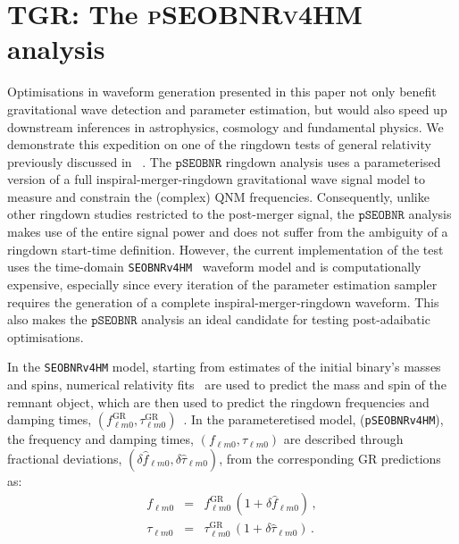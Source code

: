 \documentclass[twocolumn,prd,aps,superscriptaddress,preprintnumbers,tightenlines,showpacs,nofootinbib,eqsecnum,amsfonts,amsmath]{revtex4-1}
\newcommand{\pSEOB}{\texttt{pSEOBNR}}
\begin{document}
\section{TGR: The \textsc{pSEOBNRv4HM} analysis}
\label{sec:pa_tgr}
Optimisations in waveform generation presented in this paper not only benefit gravitational wave detection and parameter estimation, but would also speed up downstream inferences in astrophysics, cosmology and fundamental physics. We demonstrate this expedition on one of the ringdown tests of general relativity previously discussed in ~\cite{Ghosh:2016xx:prep,Abbott:2020jks,Brito:2018rfr}. The $\pSEOB$ ringdown analysis uses a parameterised version of a full inspiral-merger-ringdown gravitational wave signal model to measure and constrain the (complex) QNM frequencies. Consequently, unlike other ringdown studies restricted to the post-merger signal, the $\pSEOB$ analysis makes use of the entire signal power and does not suffer from the ambiguity of a ringdown start-time definition. However, the current implementation of the test uses the time-domain \texttt{SEOBNRv4HM}~\cite{Cotesta:2018fcv} waveform model and is computationally expensive, especially since every iteration of the parameter estimation sampler requires the generation of a complete inspiral-merger-ringdown waveform. This also makes the $\pSEOB$ analysis an ideal candidate for testing post-adaibatic optimisations.
\par
In the \texttt{SEOBNRv4HM} model, starting from estimates of the initial binary's masses and spins, numerical relativity fits~\cite{Taracchini:2013rva,Hofmann:2016yih} are used to predict the mass and spin of the remnant object, which are then used to predict the ringdown frequencies and damping times, $(f_{\ell m 0}^{\text{GR}}, \tau _{\ell m 0}^{\text{GR}})$~\cite{Berti:2005ys,Berti:2009kk}. In the parameteretised model, (\texttt{pSEOBNRv4HM}), the frequency and damping times, $(f_{\ell m 0}, \tau _{\ell m 0})$ are described through fractional deviations, $(\delta
\hat{f}_{\ell m 0},\delta \hat{\tau}_{\ell m 0})$, from the corresponding GR predictions as:
\begin{eqnarray}
f_{\ell m 0} &=& f_{\ell m 0}^{\text{GR}}\, (1 + \delta \hat{f}_{\ell m 0})\,,\label{eq:nongr_freqs_a} \\ 
\tau _{\ell m 0} &=& \tau _{\ell m 0}^{\text{GR}}\, (1 + \delta \hat{\tau}_{\ell m 0})\,. \label{eq:nongr_freqs_b}
\end{eqnarray}
\end{document}
